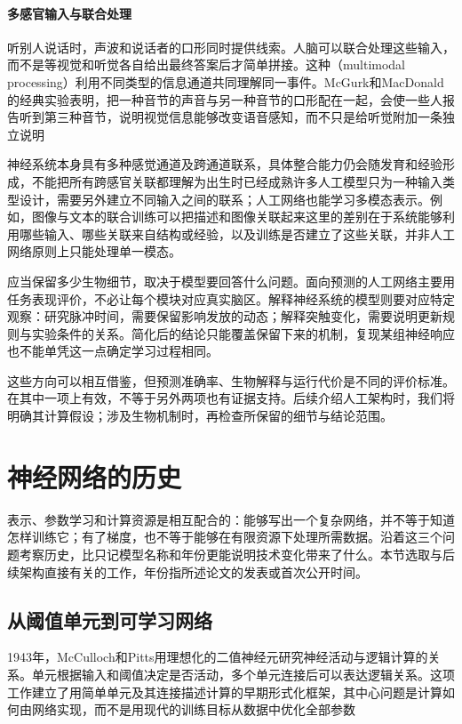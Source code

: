 \paragraph{多感官输入与联合处理}
听别人说话时，声波和说话者的口形同时提供线索。人脑可以联合处理这些输入，而不是等视觉和听觉各自给出最终答案后才简单拼接。这种（multimodal processing）利用不同类型的信息通道共同理解同一事件。McGurk和MacDonald的经典实验表明，把一种音节的声音与另一种音节的口形配在一起，会使一些人报告听到第三种音节，说明视觉信息能够改变语音感知，而不只是给听觉附加一条独立说明

神经系统本身具有多种感觉通道及跨通道联系，具体整合能力仍会随发育和经验形成，不能把所有跨感官关联都理解为出生时已经成熟许多人工模型只为一种输入类型设计，需要另外建立不同输入之间的联系；人工网络也能学习多模态表示。例如，图像与文本的联合训练可以把描述和图像关联起来这里的差别在于系统能够利用哪些输入、哪些关联来自结构或经验，以及训练是否建立了这些关联，并非人工网络原则上只能处理单一模态。

应当保留多少生物细节，取决于模型要回答什么问题。面向预测的人工网络主要用任务表现评价，不必让每个模块对应真实脑区。解释神经系统的模型则要对应特定观察：研究脉冲时间，需要保留影响发放的动态；解释突触变化，需要说明更新规则与实验条件的关系。简化后的结论只能覆盖保留下来的机制，复现某组神经响应也不能单凭这一点确定学习过程相同。

这些方向可以相互借鉴，但预测准确率、生物解释与运行代价是不同的评价标准。在其中一项上有效，不等于另外两项也有证据支持。后续介绍人工架构时，我们将明确其计算假设；涉及生物机制时，再检查所保留的细节与结论范围。

\section{神经网络的历史}
\label{sec:neural-history}

表示、参数学习和计算资源是相互配合的：能够写出一个复杂网络，并不等于知道怎样训练它；有了梯度，也不等于能够在有限资源下处理所需数据。沿着这三个问题考察历史，比只记模型名称和年份更能说明技术变化带来了什么。本节选取与后续架构直接有关的工作，年份指所述论文的发表或首次公开时间。

\subsection{从阈值单元到可学习网络}
\label{sec:neural-history-threshold}

1943年，McCulloch和Pitts用理想化的二值神经元研究神经活动与逻辑计算的关系。单元根据输入和阈值决定是否活动，多个单元连接后可以表达逻辑关系。这项工作建立了用简单单元及其连接描述计算的早期形式化框架，其中心问题是计算如何由网络实现，而不是用现代的训练目标从数据中优化全部参数

